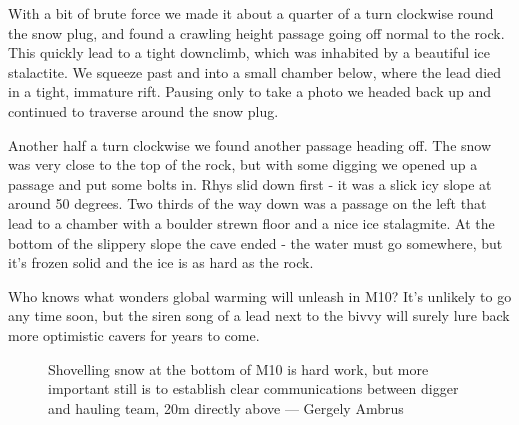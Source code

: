 With a bit of brute force we made it about a quarter of a turn clockwise round the snow plug, and found a crawling height passage going off normal to the rock. This quickly lead to a tight downclimb, which was inhabited by a beautiful ice stalactite. We squeeze past and into a small chamber below, where the lead died in a tight, immature rift. Pausing only to take a photo we headed back up and continued to traverse around the snow plug.

Another half a turn clockwise we found another passage heading off. The snow was very close to the top of the rock, but with some digging we opened up a passage and put some bolts in. Rhys slid down first - it was a slick icy slope at around 50 degrees. Two thirds of the way down was a passage on the left that lead to a chamber with a boulder strewn floor and a nice ice stalagmite. At the bottom of the slippery slope the cave ended - the water must go somewhere, but it’s frozen solid and the ice is as hard as the rock.

Who knows what wonders global warming will unleash in M10? It’s unlikely to go any time soon, but the siren song of a lead next to the bivvy will surely lure back more optimistic cavers for years to come.


\begin{figure}[b!]
\checkoddpage \ifoddpage \forcerectofloat \else \forceversofloat \fi
\centering
{}
\caption{Shovelling snow at the bottom of M10 is hard work, but more important still is to establish clear communications between digger and hauling team, 20m directly above --- Gergely Ambrus}
\label{bottom of M10}
\end{figure}

